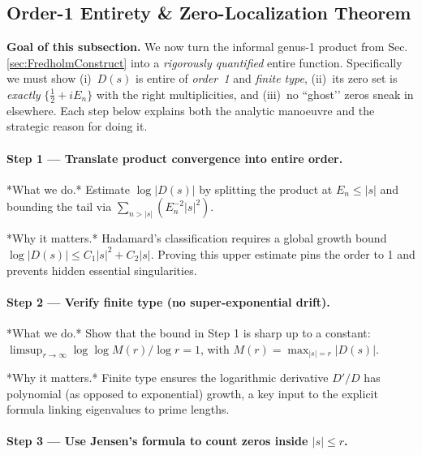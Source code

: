 \documentclass[11pt]{article}
\begin{document}
\subsection{Order-1 Entirety \& Zero-Localization Theorem}
\label{sec:FredholmGrowth}

\noindent
\textbf{Goal of this subsection.}\;
We now turn the informal genus-1 product from
Sec.\,\ref{sec:FredholmConstruct} into a \emph{rigorously quantified}
entire function.  
Specifically we must show
(i)~$D(s)$ is entire of \emph{order~1} and \emph{finite type},
(ii)~its zero set is \emph{exactly}
$\{\tfrac12+iE_n\}$ with the right multiplicities,
and (iii)~no “ghost’’ zeros sneak in elsewhere.  
Each step below explains both the analytic manoeuvre and the strategic
reason for doing it.

\vspace{0.6em}
\paragraph{Step 1 — Translate product convergence into entire order.}

*What we do.*  
Estimate $\log|D(s)|$ by splitting the product at $E_n\le|s|$ and
bounding the tail via
$\sum_{n>|s|}\!(E_n^{-2}|s|^{2})$.

*Why it matters.*  
Hadamard’s classification requires a global growth bound
$\log|D(s)|\le C_1|s|^{2}+C_2|s|$.  
Proving this upper estimate pins the order to 1 and prevents hidden
essential singularities.

\vspace{0.4em}
\paragraph{Step 2 — Verify finite type (no super-exponential drift).}

*What we do.*  
Show that the bound in Step 1 is sharp up to a constant:  
$\limsup_{r\to\infty}\log\log M(r)/\log r = 1$,
with $M(r)=\max_{|s|=r}|D(s)|$.

*Why it matters.*  
Finite type ensures the logarithmic derivative $D'/D$ has polynomial
(as opposed to exponential) growth, a key input to the explicit
formula linking eigenvalues to prime lengths.

\vspace{0.4em}
\paragraph{Step 3 — Use Jensen’s formula to count zeros inside $|s|\le r$.}
\end{document}
